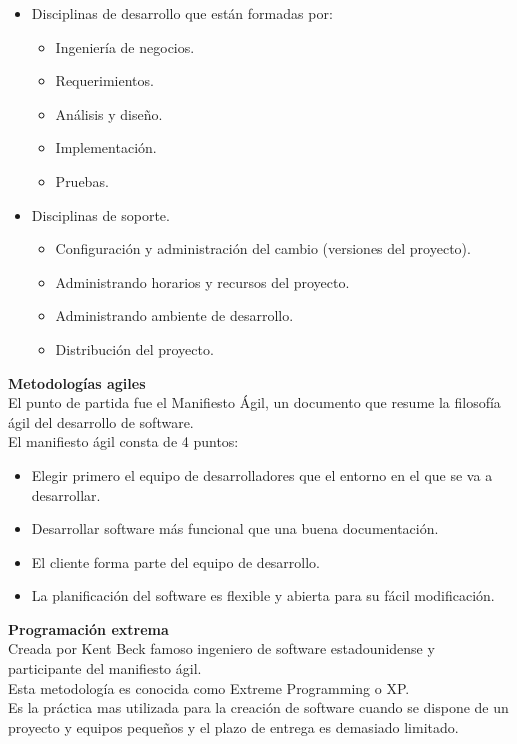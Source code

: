 \documentclass[12pt,twoside]{article}
\begin{document}
\begin{itemize}
    \item Disciplinas de desarrollo que están formadas por:
    \begin{itemize}
        \item Ingeniería de negocios.
        \item Requerimientos.
        \item Análisis y diseño.
        \item Implementación.
        \item Pruebas.
    \end{itemize}
    \item Disciplinas de soporte.
    \begin{itemize}
        \item Configuración y administración del cambio (versiones del proyecto).
        \item Administrando horarios y recursos del proyecto.
        \item Administrando ambiente de desarrollo.
        \item Distribución del proyecto.
    \end{itemize}
\end{itemize}

\textbf{Metodologías agiles}\\
El punto de partida fue el Manifiesto Ágil, un documento que resume la filosofía ágil 
del desarrollo de software.\\
El manifiesto ágil consta de 4 puntos:
\begin{itemize}
    \item Elegir primero el equipo de desarrolladores que el entorno en el que se va 
    a desarrollar.
    \item Desarrollar software más funcional que una buena documentación.
    \item El cliente forma parte del equipo de desarrollo.
    \item La planificación del software es flexible y abierta para su fácil 
    modificación.
\end{itemize}
\textbf{Programación extrema}\\
Creada por Kent Beck famoso ingeniero de software estadounidense y participante del 
manifiesto ágil.\\
Esta metodología es conocida como Extreme Programming o XP.\\
Es la práctica mas utilizada para la creación de software cuando se dispone de un 
proyecto y equipos pequeños y el plazo de entrega es demasiado limitado.\\ \\
\end{document}
